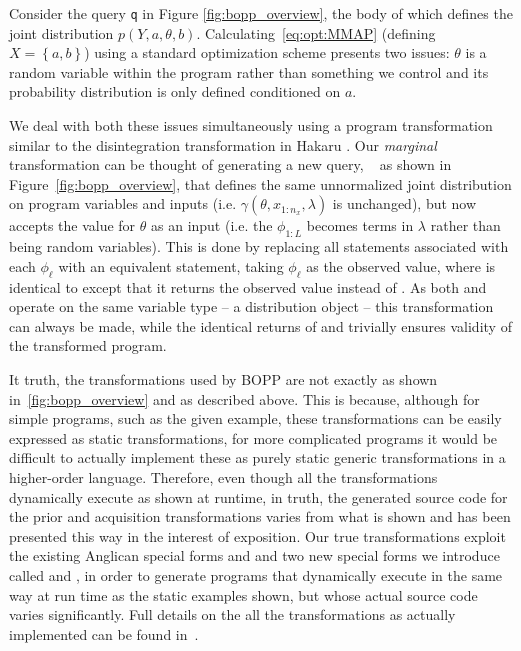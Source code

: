 
Consider the  query \texttt{q} in Figure \ref{fig:bopp_overview}, the body of which defines the joint distribution $p\left(Y,a,\theta,b\right)$.   Calculating~\eqref{eq:opt:MMAP} (defining $X=\left\{a,b\right\}$) using a standard optimization scheme presents two issues: $\theta$ is a random variable within the program rather than something we control and its probability distribution is only defined conditioned on $a$.

We deal with both these issues simultaneously using a program transformation similar to the disintegration transformation in Hakaru \citep{zinkov2016composing}. Our \emph{marginal} transformation can be thought of generating a new query, \qmarg~ as shown in Figure~\ref{fig:bopp_overview}, that defines the same unnormalized joint distribution on program variables and inputs (i.e. $\gamma(\theta,x_{1:n_x},\lambda)$ is unchanged), but now accepts the value for $\theta$ as an input (i.e. the $\phi_{1:L}$ becomes terms in $\lambda$ rather than being random variables).  This is done by replacing all \sample statements associated with each $\phi_{\ell}$ with an equivalent \observes statement, taking $\phi_{\ell}$ as the observed value, where \observes is identical to \observe except that it returns the observed value instead of .  As both \sample and \observe operate on the same variable type -- a distribution object -- this transformation can always be made, while the identical returns of \sample and \observes trivially ensures validity of the transformed program.  

It truth, the transformations used by BOPP are not exactly as shown in~\ref{fig:bopp_overview}
and as described above.  This is because, although for simple programs, such as the given
example, these transformations can be easily expressed as static transformations, for more
complicated programs it would be difficult to actually implement these as purely static
generic transformations in a higher-order language.  Therefore, even though all the
transformations dynamically execute as shown at runtime, in truth, the generated source 
code for the prior and acquisition transformations varies from what is shown and has 
been presented this way in the interest of exposition.  Our true transformations exploit
the existing Anglican special forms  and  and two new
special forms we introduce called  and , in order to generate programs
that dynamically execute in the same way at run time as the static examples shown, but
whose actual source code varies significantly.  Full details on the all the transformations
as actually implemented can be found in~\cite{rainforth2017boppArxiv}.

